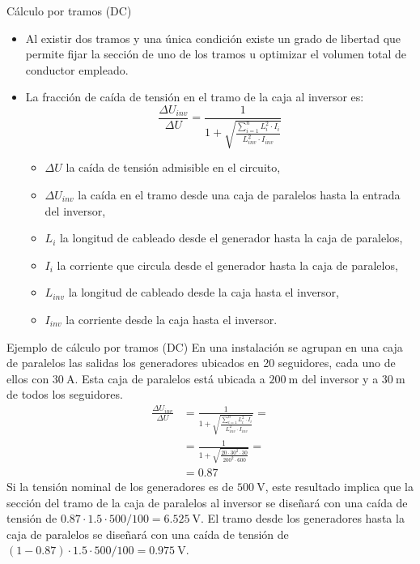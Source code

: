 \documentclass[aspectratio=169, usenames,svgnames,dvipsnames]{beamer}
\begin{document}
\begin{frame}[label={sec:org4c15ab0}]{Cálculo por tramos (DC)}
\begin{itemize}
\item Al existir dos tramos y una única condición existe un grado de libertad que permite fijar la sección de uno de los tramos u optimizar el volumen total de conductor empleado.

\item La fracción de caída de tensión en el tramo de la caja al inversor es:  
\begin{equation*}
  \frac{\Delta U_{inv}}{\Delta U}= \frac{1}{1+\sqrt{\frac{\sum_{i=1}^nL_{i}^2
        \cdot I_{i}}{L_{inv}^2 \cdot I_{inv}}}}
\end{equation*}

\begin{itemize}
\item \(\Delta U\) la caída de tensión admisible en el circuito,

\item \(\Delta U_{inv}\) la caída en el tramo desde una caja de paralelos hasta la entrada del inversor,

\item \(L_i\) la longitud de cableado desde el generador hasta la caja de paralelos,

\item \(I_i\) la corriente que circula desde el generador hasta la caja de paralelos,

\item \(L_{inv}\) la longitud de cableado desde la caja hasta el inversor,

\item \(I_{inv}\) la corriente desde la caja hasta el inversor.
\end{itemize}
\end{itemize}
\end{frame}
\begin{frame}[label={sec:orgd9e9b9d}]{Ejemplo de cálculo por tramos (DC)}
En una instalación se agrupan en una caja de paralelos las salidas los generadores ubicados en 20 seguidores, cada uno de ellos con \(\qty{30}{\ampere}\). Esta caja de paralelos está ubicada a \(\qty{200}{\meter}\) del inversor y a \(\qty{30}{\meter}\) de todos los seguidores.
\begin{align*}
  \frac{\Delta U_{inv}}{\Delta U} &= \frac{1}{1+\sqrt{\frac{\sum_{i=1}^nL_{i}^2
                                    \cdot I_{i}}{L_{inv}^2 \cdot I_{inv}}}} = \\
                                  &=\frac{1}{1 + \sqrt{\frac{20 \cdot 30^2 \cdot 30}{200^2 \cdot 600 }}} = \\
                                  &= \num{0.87}
\end{align*}
Si la tensión nominal de los generadores es de \(\qty{500}{\volt}\), este resultado implica que la sección del tramo de la caja de paralelos al inversor se diseñará con una caída de tensión de \(\num{0.87} \cdot \num{1.5} \cdot 500 /100 = \qty{6.525}{\volt}\). El tramo desde los generadores hasta la caja de paralelos se diseñará con una caída de tensión de \((1 - \num{0.87}) \cdot \num{1.5} \cdot 500 /100 = \qty{0.975}{\volt}\).
\end{frame}
\end{document}
